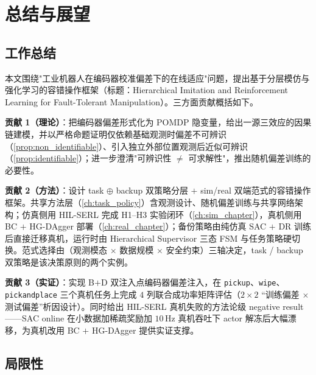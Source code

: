 
\chapter{总结与展望}\label{ch:conclusion}

\section{工作总结}\label{sec:summary}

本文围绕"工业机器人在编码器校准偏差下的在线适应"问题，提出基于分层模仿与强化学习的容错操作框架（标题：Hierarchical Imitation and Reinforcement Learning for Fault-Tolerant Manipulation）。三方面贡献概括如下。

\textbf{贡献 1（理论）}：把编码器偏差形式化为 POMDP 隐变量，给出一源三效应的因果链建模，并以严格命题证明仅依赖基础观测时偏差不可辨识（\cref{prop:non_identifiable}）、引入独立外部位置观测后近似可辨识（\cref{prop:identifiable}）；进一步澄清"可辨识性 $\neq$ 可求解性"，推出随机偏差训练的必要性。

\textbf{贡献 2（方法）}：设计 task $\oplus$ backup 双策略分层 $+$ sim/real 双端范式的容错操作框架。共享方法层（\cref{ch:task_policy}）含观测设计、随机偏差训练与共享网络架构；仿真侧用 HIL-SERL 完成 H1–H3 实验闭环（\cref{ch:sim_chapter}），真机侧用 BC $+$ HG-DAgger 部署（\cref{ch:real_chapter}）；备份策略由纯仿真 SAC $+$ DR 训练后直接迁移真机，运行时由 Hierarchical Supervisor 三态 FSM 与任务策略硬切换。范式选择由（观测模态 $\times$ 数据规模 $\times$ 安全约束）三轴决定，task / backup 双策略是该决策原则的两个实例。

\textbf{贡献 3（实证）}：实现 B$+$D 双注入点编码器偏差注入，在 \texttt{pickup}、\texttt{wipe}、\texttt{pickandplace} 三个真机任务上完成 $4$ 列联合成功率矩阵评估（$2\times2$ “训练偏差 $\times$ 测试偏差”析因设计）。同时给出 HIL-SERL 真机失败的方法论级 negative result——SAC online 在小数据加稀疏奖励加 $10$\,Hz 真机吞吐下 actor 解冻后大幅漂移，为真机改用 BC $+$ HG-DAgger 提供实证支撑。

\section{局限性}\label{sec:limitations}

